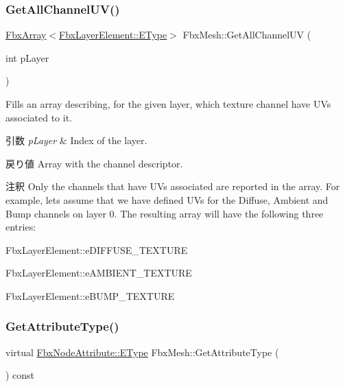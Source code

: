 \subsubsection{\texorpdfstring{Get\+All\+Channel\+U\+V()}{GetAllChannelUV()}}
{\footnotesize\ttfamily \hyperlink{class_fbx_array}{Fbx\+Array}$<$\hyperlink{class_fbx_layer_element_a8c95c5cd880b56c776acd379bd86f42c}{Fbx\+Layer\+Element\+::\+E\+Type}$>$ Fbx\+Mesh\+::\+Get\+All\+Channel\+UV (\begin{DoxyParamCaption}\item[{int}]{p\+Layer }\end{DoxyParamCaption})}

Fills an array describing, for the given layer, which texture channel have U\+Vs associated to it. 
\begin{DoxyParams}{引数}
{\em p\+Layer} & Index of the layer. \\
\hline
\end{DoxyParams}
\begin{DoxyReturn}{戻り値}
Array with the channel descriptor. 
\end{DoxyReturn}
\begin{DoxyRemark}{注釈}
Only the channels that have U\+Vs associated are reported in the array. For example, let\textquotesingle{}s assume that we have defined U\+Vs for the Diffuse, Ambient and Bump channels on layer 0. The resulting array will have the following three entries\+: \begin{DoxyItemize}
\item Fbx\+Layer\+Element\+::e\+D\+I\+F\+F\+U\+S\+E\+\_\+\+T\+E\+X\+T\+U\+RE \item Fbx\+Layer\+Element\+::e\+A\+M\+B\+I\+E\+N\+T\+\_\+\+T\+E\+X\+T\+U\+RE \item Fbx\+Layer\+Element\+::e\+B\+U\+M\+P\+\_\+\+T\+E\+X\+T\+U\+RE \end{DoxyItemize}

\end{DoxyRemark}
\mbox{\label{class_fbx_mesh_a5a52e41ccf1382c40d3361ec3cfbb68a}} 
\subsubsection{\texorpdfstring{Get\+Attribute\+Type()}{GetAttributeType()}}
{\footnotesize\ttfamily virtual \hyperlink{class_fbx_node_attribute_a08e1669d3d1a696910756ab17de56d6a}{Fbx\+Node\+Attribute\+::\+E\+Type} Fbx\+Mesh\+::\+Get\+Attribute\+Type (\begin{DoxyParamCaption}{ }\end{DoxyParamCaption}) const\hspace{0.3cm}{\ttfamily [virtual]}}

